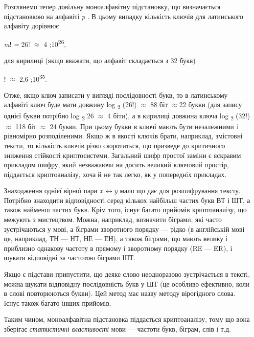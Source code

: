 {\bigskip


\bigskip

Розглянемо тепер довільну моноалфавітну підстановку, що визначається
підстановкою  на алфавіті  \textit{\textgreek{p}}\textbf{\textit{ }}. В цьому
випадку кількість ключів для латинського алфавіту дорівнює

{\centering
\textit{m}!\textit{ = }26!\textit{ $\approx$}\textsf{ }4
\textgreek{;}10\textsuperscript{26}\textit{,}
\par}

для кирилиці (якщо вважати, що алфавіт складається з 32 букв)

{! $\approx$ 2,6 \textgreek{;}10\textsuperscript{35}.
\par}

Отже, якщо ключ записати у вигляді послідовності букв, то в латинському алфавіті
ключ буде мати довжину  log \textsubscript{2 }(26!) $\approx$ 88 біт
$\approx$22 букви  (для запису однієї букви потрібно log \textsubscript{2 }26
$\approx$ 4 біти), а в кирилиці довжина ключа  log \textsubscript{2 }(32!)
$\approx$ 118 біт $\approx$ 24 букви. При цьому букви в ключі мають бути
незалежними і рівномірно розподіленими. Якщо ж в якості ключів брати,
наприклад, змістовні тексти, то кількість ключів різко скоротиться, що призведе
до критичного зниження стійкості криптосистеми. Загальний шифр простої заміни є
яскравим прикладом шифру, який незважаючи на досить великий ключовий простір,
піддається криптоаналізу, хоча й не так легко, як у попередніх прикладах.

Знаходження однієї вірної пари   $x\leftrightarrow y$ мало що дає для
розшифрування тексту. Потрібно знаходити відповідності серед кількох найбільш
частих букв ВТ і ШТ, а також найменш частих букв. Крім того, існує багато
прийомів криптоаналізу, що межують з мистецтвом. Можна, наприклад, визначити
біграми, які часто зустрічаються у мові, а  біграми зворотного порядку --- рідко
(в англійській мові це, наприклад, ТН --- НТ, НЕ --- ЕН), а також біграми, що мають
велику і приблизно однакову частоту в прямому і зворотному порядку (RE --- ER), і
шукати відповідні за частотою  біграми ШТ.

Якщо є підстави припустити, що деяке слово неодноразово зустрічається в тексті,
можна шукати відповідну послідовність букв у ШТ (це особливо ефективно, коли в
слові повторюються букви). Цей метод має назву методу вірогідного слова. Існує
також багато інших прийомів.

Таким чином, моноалфавітна підстановка піддається криптоаналізу, тому що вона
зберігає \textit{статистичні властивості} мови --- частоти букв, біграм, слів і
т.д.

}
